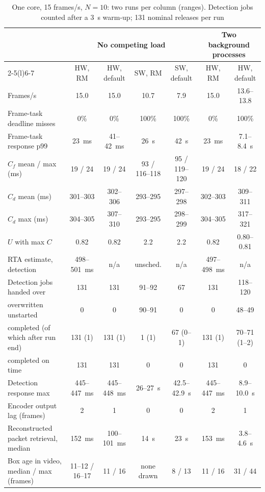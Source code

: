 \documentclass[conference]{IEEEtran}
\begin{document}
\begin{table}[t]
\caption{One core, 15 frames/s, $N=10$: two runs per column (ranges). Detection jobs counted after a \SI{3}{\second} warm-up; 131 nominal releases per run}
\label{tab:sched}
\centering
\small
\setlength{\tabcolsep}{5pt}
\begin{tabular}{@{}lcccccc@{}}
\toprule
 & \multicolumn{4}{c}{No competing load} & \multicolumn{2}{c}{Two background processes} \\
\cmidrule(lr){2-5}\cmidrule(l){6-7}
 & HW, RM & HW, default & SW, RM & SW, default & HW, RM & HW, default \\
\midrule
Frames/s & 15.0 & 15.0 & 10.7 & 7.9 & 15.0 & 13.6--13.8 \\
Frame-task deadline misses & 0\% & 0\% & 100\% & 100\% & 0\% & 100\% \\
Frame-task response p99 & 23~ms & 41--42~ms & 26~s & 42~s & 23~ms & 7.1--8.4~s \\
$C_f$ mean / max (ms) & 19 / 24 & 19 / 24 & 93 / 116--118 & 95 / 119--120 & 19 / 24 & 18 / 22 \\
$C_d$ mean (ms) & 301--303 & 302--306 & 293--295 & 297--298 & 302--303 & 309--311 \\
$C_d$ max (ms) & 304--305 & 307--310 & 293--295 & 298--299 & 304--305 & 317--321 \\
$U$ with max $C$ & 0.82 & 0.82 & 2.2 & 2.2 & 0.82 & 0.80--0.81 \\
RTA estimate, detection & 498--501~ms & n/a & unsched. & n/a & 497--498~ms & n/a \\
\midrule
Detection jobs handed over & 131 & 131 & 91--92 & 67 & 131 & 118--120 \\
\quad overwritten unstarted & 0 & 0 & 90--91 & 0 & 0 & 48--49 \\
\quad completed (of which after run end) & 131 (1) & 131 (1) & 1 (1) & 67 (0--1) & 131 (1) & 70--71 (1--2) \\
\quad completed on time & 131 & 131 & 0 & 0 & 131 & 0 \\
Detection response max & 445--447~ms & 445--448~ms & 26--27~s & 42.5--42.9~s & 445--447~ms & 8.9--10.0~s \\
\midrule
Encoder output lag (frames) & 2 & 1 & 0 & 0 & 2 & 1 \\
Reconstructed packet retrieval, median & 152~ms & 100--101~ms & 14~s & 23~s & 153~ms & 3.8--4.6~s \\
Box age in video, median / max (frames) & 11--12 / 16--17 & 11 / 16 & none drawn & 8 / 13 & 11 / 16 & 31 / 44 \\

\end{tabular}
\end{table}
\end{document}
